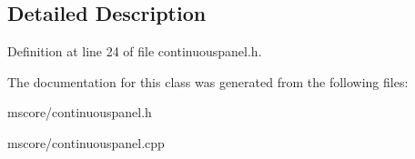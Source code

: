 \subsection{Detailed Description}


Definition at line 24 of file continuouspanel.\+h.



The documentation for this class was generated from the following files\+:\begin{DoxyCompactItemize}
\item 
mscore/continuouspanel.\+h\item 
mscore/continuouspanel.\+cpp\end{DoxyCompactItemize}
